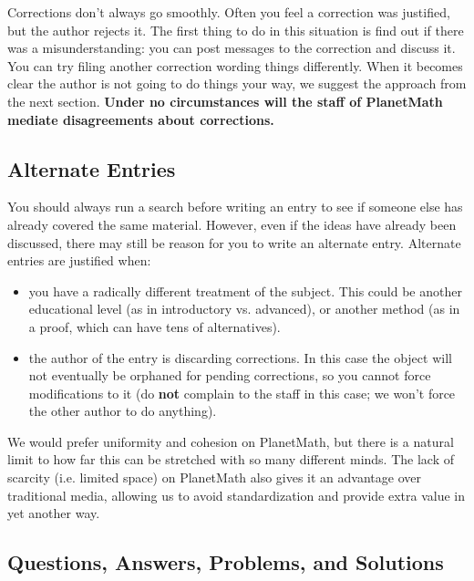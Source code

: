 Corrections don't always go smoothly. Often you feel a correction was
justified, but the author rejects it. The first thing to do in this
situation is find out if there was a misunderstanding: you can post
messages to the correction and discuss it. You can try filing another
correction wording things differently. When it becomes clear the
author is not going to do things your way, we suggest the approach
from the next section. \textbf{Under no circumstances will the staff
of PlanetMath mediate disagreements about corrections.}

\subsection{Alternate Entries}
You should always run a search before writing an entry to see if
someone else has already covered the same material. However, even if
the ideas have already been discussed, there may still be reason for
you to write an alternate entry. Alternate entries are justified when:
\begin{itemize}
\item you have a radically different treatment of the subject. This
could be another educational level (as in introductory
vs. advanced), or another method (as in a proof, which can have tens
of alternatives).
\item the author of the entry is discarding corrections. In this case
the object will not eventually be orphaned for pending corrections,
so you cannot force modifications to it (do \textbf{not} complain to
the staff in this case; we won't force the other author to do
anything).
\end{itemize}
We would prefer uniformity and cohesion on PlanetMath, but there is a
natural limit to how far this can be stretched with so many different
minds. The lack of scarcity (i.e. limited space) on PlanetMath also
gives it an advantage over traditional media, allowing us to avoid
standardization and provide extra value in yet another way.

\subsection{Questions, Answers, Problems, and Solutions}
